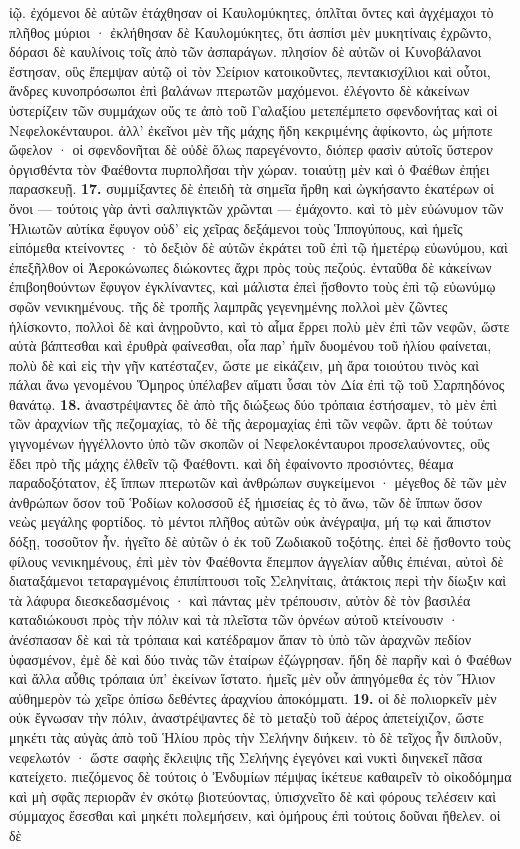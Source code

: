 \documentclass[a4paper, 11pt, oneside, polutonikogreek, german]{article}
\begin{document}
ἰῷ. ἐχόμενοι δὲ αὐτῶν ἐτάχθησαν οἱ Καυλομύκητες, ὁπλῖται ὄντες καὶ ἀγχέμαχοι τὸ πλῆθος μύριοι · ἐκλήθησαν δὲ Καυλομύκητες, ὅτι ἀσπίσι μὲν μυκητίναις ἐχρῶντο, δόρασι δὲ καυλίνοις τοῖς ἀπὸ τῶν ἀσπαράγων. πλησίον δὲ αὐτῶν οἱ Κυνοβάλανοι ἔστησαν, οὓς ἔπεμψαν αὐτῷ οἱ τὸν Σείριον κατοικοῦντες, πεντακισχίλιοι καὶ οὗτοι, ἄνδρες κυνοπρόσωποι ἐπὶ βαλάνων πτερωτῶν μαχόμενοι. ἐλέγοντο δὲ κἀκείνων ὑστερίζειν τῶν συμμάχων οὕς τε ἀπὸ τοῦ Γαλαξίου μετεπέμπετο σφενδονήτας καὶ οἱ Νεφελοκένταυροι. ἀλλ' ἐκεῖνοι μὲν τῆς μάχης ἤδη κεκριμένης ἀφίκοντο, ὡς μήποτε ὤφελον · οἱ σφενδονῆται δὲ οὐδὲ ὅλως παρεγένοντο, διόπερ φασὶν αὐτοῖς ὕστερον ὀργισθέντα τὸν Φαέθοντα πυρπολῆσαι τὴν χώραν. τοιαύτῃ μὲν καὶ ὁ Φαέθων ἐπῄει παρασκευῇ. \textbf{17.} συμμίξαντες δὲ ἐπειδὴ τὰ σημεῖα ἤρθη καὶ ὠγκήσαντο ἑκατέρων οἱ ὄνοι --- τούτοις γὰρ ἀντὶ σαλπιγκτῶν χρῶνται --- ἐμάχοντο. καὶ τὸ μὲν εὐώνυμον τῶν Ἡλιωτῶν αὐτίκα ἔφυγον οὐδ' εἰς χεῖρας δεξάμενοι τοὺς Ἱππογύπους, καὶ ἡμεῖς εἱπόμεθα κτείνοντες · τὸ δεξιὸν δὲ αὐτῶν ἐκράτει τοῦ ἐπὶ τῷ ἡμετέρῳ εὐωνύμου, καὶ ἐπεξῆλθον οἱ Ἀεροκώνωπες διώκοντες ἄχρι πρὸς τοὺς πεζούς. ἐνταῦθα δὲ κἀκείνων ἐπιβοηθούντων ἔφυγον ἐγκλίναντες, καὶ μάλιστα ἐπεὶ ᾔσθοντο τοὺς ἐπὶ τῷ εὐωνύμῳ σφῶν νενικημένους. τῆς δὲ τροπῆς λαμπρᾶς γεγενημένης πολλοὶ μὲν ζῶντες ἡλίσκοντο, πολλοὶ δὲ καὶ ἀνῃροῦντο, καὶ τὸ αἷμα ἔρρει πολὺ μὲν ἐπὶ τῶν νεφῶν, ὥστε αὐτὰ βάπτεσθαι καὶ ἐρυθρὰ φαίνεσθαι, οἷα παρ' ἡμῖν δυομένου τοῦ ἡλίου φαίνεται, πολὺ δὲ καὶ εἰς τὴν γῆν κατέσταζεν, ὥστε με εἰκάζειν, μὴ ἄρα τοιούτου τινὸς καὶ πάλαι ἄνω γενομένου Ὅμηρος ὑπέλαβεν αἵματι ὗσαι τὸν Δία ἐπὶ τῷ τοῦ Σαρπηδόνος θανάτῳ. \textbf{18.} ἀναστρέψαντες δὲ ἀπὸ τῆς διώξεως δύο τρόπαια ἐστήσαμεν, τὸ μὲν ἐπὶ τῶν ἀραχνίων τῆς πεζομαχίας, τὸ δὲ τῆς ἀερομαχίας ἐπὶ τῶν νεφῶν. ἄρτι δὲ τούτων γιγνομένων ἠγγέλλοντο ὑπὸ τῶν σκοπῶν οἱ Νεφελοκένταυροι προσελαύνοντες, οὓς ἔδει πρὸ τῆς μάχης ἐλθεῖν τῷ Φαέθοντι. καὶ δὴ ἐφαίνοντο προσιόντες, θέαμα παραδοξότατον, ἐξ ἵππων πτερωτῶν καὶ ἀνθρώπων συγκείμενοι · μέγεθος δὲ τῶν μὲν ἀνθρώπων ὅσον τοῦ Ῥοδίων κολοσσοῦ ἐξ ἡμισείας ἐς τὸ ἄνω, τῶν δὲ ἵππων ὅσον νεὼς μεγάλης φορτίδος. τὸ μέντοι πλῆθος αὐτῶν οὐκ ἀνέγραψα, μή τῳ καὶ ἄπιστον δόξῃ, τοσοῦτον ἦν. ἡγεῖτο δὲ αὐτῶν ὁ ἐκ τοῦ Ζωδιακοῦ τοξότης. ἐπεὶ δὲ ᾔσθοντο τοὺς φίλους νενικημένους, ἐπὶ μὲν τὸν Φαέθοντα ἔπεμπον ἀγγελίαν αὖθις ἐπιέναι, αὐτοὶ δὲ διαταξάμενοι τεταραγμένοις ἐπιπίπτουσι τοῖς Σεληνίταις, ἀτάκτοις περὶ τὴν δίωξιν καὶ τὰ λάφυρα διεσκεδασμένοις · καὶ πάντας μὲν τρέπουσιν, αὐτὸν δὲ τὸν βασιλέα καταδιώκουσι πρὸς τὴν πόλιν καὶ τὰ πλεῖστα τῶν ὀρνέων αὐτοῦ κτείνουσιν · ἀνέσπασαν δὲ καὶ τὰ τρόπαια καὶ κατέδραμον ἅπαν τὸ ὑπὸ τῶν ἀραχνῶν πεδίον ὑφασμένον, ἐμὲ δὲ καὶ δύο τινὰς τῶν ἑταίρων ἐζώγρησαν. ἤδη δὲ παρῆν καὶ ὁ Φαέθων καὶ ἄλλα αὖθις τρόπαια ὑπ' ἐκείνων ἵστατο. ἡμεῖς μὲν οὖν ἀπηγόμεθα ἐς τὸν Ἥλιον αὐθημερὸν τὼ χεῖρε ὀπίσω δεθέντες ἀραχνίου ἀποκόμματι. \textbf{19.} οἱ δὲ πολιορκεῖν μὲν οὐκ ἔγνωσαν τὴν πόλιν, ἀναστρέψαντες δὲ τὸ μεταξὺ τοῦ ἀέρος ἀπετείχιζον, ὥστε μηκέτι τὰς αὐγὰς ἀπὸ τοῦ Ἡλίου πρὸς τὴν Σελήνην διήκειν. τὸ δὲ τεῖχος ἦν διπλοῦν, νεφελωτόν · ὥστε σαφὴς ἔκλειψις τῆς Σελήνης ἐγεγόνει καὶ νυκτὶ διηνεκεῖ πᾶσα κατείχετο. πιεζόμενος δὲ τούτοις ὁ Ἐνδυμίων πέμψας ἱκέτευε καθαιρεῖν τὸ οἰκοδόμημα καὶ μὴ σφᾶς περιορᾶν ἐν σκότῳ βιοτεύοντας, ὑπισχνεῖτο δὲ καὶ φόρους τελέσειν καὶ σύμμαχος ἔσεσθαι καὶ μηκέτι πολεμήσειν, καὶ ὁμήρους ἐπὶ τούτοις δοῦναι ἤθελεν. οἱ δὲ 
\end{document}

